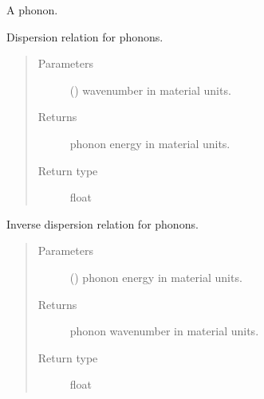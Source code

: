 \documentclass[letterpaper,10pt,english]{sphinxmanual}
\begin{document}
\begin{fulllineitems}
\label{\detokenize{code_structure:scdc.particle.Phonon}}
A phonon.

\begin{fulllineitems}
\label{\detokenize{code_structure:scdc.particle.Phonon.dispersion}}
Dispersion relation for phonons.
\begin{quote}\begin{description}
\item[{Parameters}] \leavevmode
{} () \textendash{} wavenumber in material units.

\item[{Returns}] \leavevmode
phonon energy in material units.

\item[{Return type}] \leavevmode
float

\end{description}\end{quote}

\end{fulllineitems}


\begin{fulllineitems}
\label{\detokenize{code_structure:scdc.particle.Phonon.dispersion_inverse}}
Inverse dispersion relation for phonons.
\begin{quote}\begin{description}
\item[{Parameters}] \leavevmode
{} () \textendash{} phonon energy in material units.

\item[{Returns}] \leavevmode
phonon wavenumber in material units.

\item[{Return type}] \leavevmode
float

\end{description}\end{quote}

\end{fulllineitems}


\end{fulllineitems}
\end{document}
